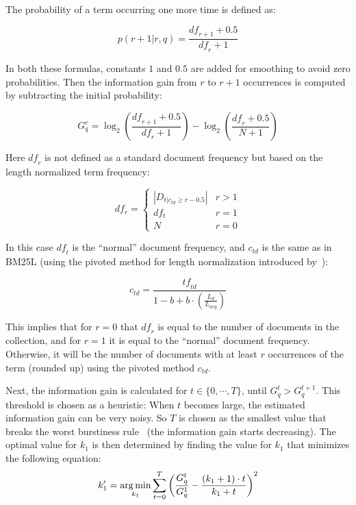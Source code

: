 The probability of a term occurring one more time is defined as:

\begin{equation}
	p(r+1|r,q) = \frac{\mathit{df}_{r+1}+0.5}{\mathit{df}_r+1}
\end{equation}

In both these formulas, constants $1$ and $0.5$ are added for smoothing to avoid zero probabilities. Then the information gain from $r$ to $r+1$ occurrences is computed by subtracting the initial probability: 

\begin{equation}
	G^r_q = \log_2\left(\frac{\mathit{df}_{r+1} + 0.5}{\mathit{df}_r+1}\right) - \log_2 \left(\frac{\mathit{df}_{r} + 0.5}{N+1}\right)
\end{equation}

Here $\mathit{df}_r$ is not defined as a standard document frequency but based on the length normalized term frequency:

\begin{equation}
	df_r = 
	\begin{cases}
		|D_{t|c_{td}\geq r-0.5}| & r > 1\\ 
		df_t & r = 1\\
		N & r= 0
	\end{cases}
\end{equation}

In this case $\mathit{df}_t$ is the ``normal'' document frequency, and $c_{\mathit{td}}$ is the same as in BM25L (using the pivoted method for length normalization introduced by~\citet{ctd}):

\begin{equation}
	c_{\mathit{td}} = \frac{\mathit{tf}_{\mathit{td}}}{1-b+b\cdot\left(\frac{L_d}{L_{\mathit{avg}}}\right)}
\end{equation}

This implies that for $r = 0$ that $\mathit{df}_r$ is equal to the number of documents in the collection, and for $r = 1$ it is equal to the ``normal'' document frequency. Otherwise, it will be the number of documents with at least $r$ occurrences of the term (rounded up) using the pivoted method $c_{\mathit{td}}$. 

Next, the information gain is calculated for $t \in \{0,\cdots,T\}$, until $G^t_q > G^{t+1}_q$. This threshold is chosen as a heuristic: When $t$ becomes large, the estimated information gain can be very noisy. So $T$ is chosen as the smallest value that breaks the worst burstiness rule~\citep{burstiness_rule} (the information gain starts decreasing). The optimal value for $k_1$ is then determined by finding the value for $k_1$ that minimizes the following equation:
\begin{equation}
	k'_1 = \operatorname*{arg\,min}_{k_1} \sum_{t=0}^{T}\left(\frac{G^t_q}{G^1_q} - \frac{(k_1+1)\cdot t}{k_1+t}\right)^2
\end{equation}

